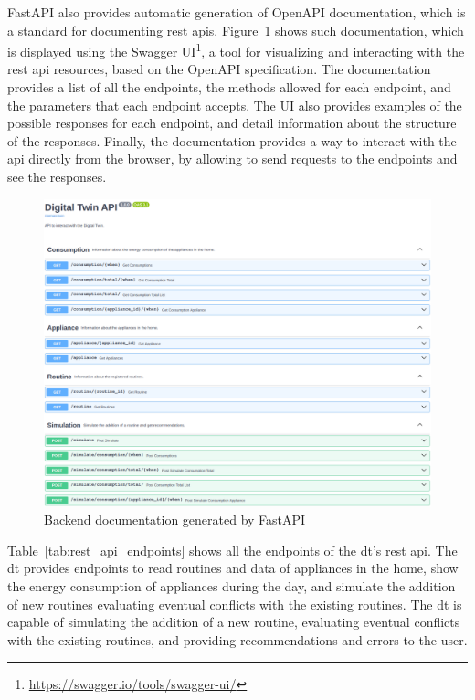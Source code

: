 FastAPI also provides automatic generation of OpenAPI documentation, which is a standard for documenting \acrshort{rest} \acrshort{api}s. Figure~\ref{fig:backend_swagger} shows such documentation, which is displayed using the Swagger UI\footnote{\url{https://swagger.io/tools/swagger-ui/}}, a tool for visualizing and interacting with the \acrshort{rest} \acrshort{api} resources, based on the OpenAPI specification. The documentation provides a list of all the endpoints, the methods allowed for each endpoint, and the parameters that each endpoint accepts. The UI also provides examples of the possible responses for each endpoint, and detail information about the structure of the responses. Finally, the documentation provides a way to interact with the \acrshort{api} directly from the browser, by allowing to send requests to the endpoints and see the responses.

\begin{figure}
    \centering
    \includegraphics[width=\textwidth]{images/backend_swagger.png}
    \caption{Backend documentation generated by FastAPI}
    \label{fig:backend_swagger}
\end{figure}

Table~\ref{tab:rest_api_endpoints} shows all the endpoints of the \acrshort{dt}'s \acrshort{rest} \acrshort{api}. The \acrshort{dt} provides endpoints to read routines and data of appliances in the home, show the energy consumption of appliances during the day, and simulate the addition of new routines evaluating eventual conflicts with the existing routines. The \acrshort{dt} is capable of simulating the addition of a new routine, evaluating eventual conflicts with the existing routines, and providing recommendations and errors to the user. 

